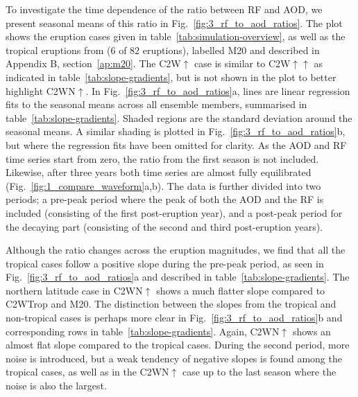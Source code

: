 \documentclass[draft]{agujournal2019}
\begin{document}
To investigate the time dependence of the ratio between RF and AOD, we present seasonal
means of this ratio in Fig.~\ref{fig:3_rf_to_aod_ratios}. The plot shows the eruption
cases given in table~\ref{tab:simulation-overview}, as well as the tropical eruptions
from  (\(6\) of \(82\) eruptions), labelled M20 and described
in Appendix B, section~\ref{ap:m20}. The C2W\(\uparrow\) case is similar to
C2W\(\uparrow\uparrow\) as indicated in table~\ref{tab:slope-gradients}, but is not
shown in the plot to better highlight C2WN\(\uparrow\). In
Fig.~\ref{fig:3_rf_to_aod_ratios}a, lines are linear regression fits to the seasonal
means across all ensemble members, summarised in table~\ref{tab:slope-gradients}. Shaded
regions are the standard deviation around the seasonal means. A similar shading is
plotted in Fig.~\ref{fig:3_rf_to_aod_ratios}b, but where the regression fits have been
omitted for clarity. As the AOD and RF time series start from zero, the ratio from the
first season is not included. Likewise, after three years both time series are almost
fully equilibrated (Fig.~\ref{fig:1_compare_waveform}a,b). The data is further divided
into two periods; a pre-peak period where the peak of both the AOD and the RF is
included (consisting of the first post-eruption year), and a post-peak period for the
decaying part (consisting of the second and third post-eruption years).

Although the ratio changes across the eruption magnitudes, we find that all the tropical
cases follow a positive slope during the pre-peak period, as seen in
Fig.~\ref{fig:3_rf_to_aod_ratios}a and described in table~\ref{tab:slope-gradients}. The
northern latitude case in C2WN\(\uparrow\) shows a much flatter slope compared to
C2WTrop and M20. The distinction between the slopes from the tropical and non-tropical
cases is perhaps more clear in Fig.~\ref{fig:3_rf_to_aod_ratios}b and corresponding rows
in table~\ref{tab:slope-gradients}. Again, C2WN\(\uparrow\) shows an almost flat slope
compared to the tropical cases. During the second period, more noise is introduced, but
a weak tendency of negative slopes is found among the tropical cases, as well as in the
C2WN\(\uparrow\) case up to the last season where the noise is also the largest.
\end{document}

